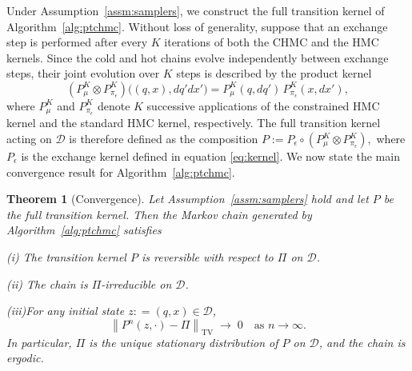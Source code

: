 \documentclass[12pt]{article}
\newtheorem{theorem}{Theorem}[section]
\begin{document}
Under Assumption~\ref{assm:samplers}, we construct the full transition kernel of Algorithm~\ref{alg:ptchmc}. Without loss of generality, suppose that an exchange step is performed after every $K$ iterations of both the CHMC and the HMC kernels. 
Since the cold and hot chains evolve independently between exchange steps, their joint evolution over $K$ steps is described by the product kernel
\[
\left(
P_\mu^K \otimes P_{\pi_\epsilon}^K
\right)
\big((q,x), dq' dx'\big)
=
P_\mu^K(q,dq') \,
P_{\pi_\epsilon}^K(x,dx'),
\]
where $P_\mu^K$ and $P_{\pi_\epsilon}^K$ denote $K$ successive applications of the constrained HMC kernel and the standard HMC kernel, respectively.
The full transition kernel acting on $\mathcal D$ is therefore defined as the composition
\(
P
:=
P_\epsilon
\circ
\left(
P_\mu^K \otimes P_{\pi_\epsilon}^K
\right),
\) where $P_\epsilon$ is the exchange kernel defined in equation \eqref{eq:kernel}.
We now state the main convergence result for Algorithm~\ref{alg:ptchmc}.

\begin{theorem}[Convergence]\label{thm:pt_full}
Let Assumption~\ref{assm:samplers} hold and let $P$ be the full transition kernel. Then the Markov chain generated by Algorithm~\ref{alg:ptchmc} satisfies

(i) The transition kernel $P$ is reversible with respect to $\Pi$ on $\mathcal{D}$.

(ii) The chain is $\Pi$-irreducible on $\mathcal{D}$.

(iii)For any initial state $z: = (q, x)\in\mathcal{D}$,
    \[
        \left\| P^n\left (z,\cdot \right ) - \Pi \right\|_{\mathrm{TV}} \;\longrightarrow\; 0 \quad \text{as } n\to\infty.
    \]
In particular, $\Pi$ is the unique stationary distribution of $P$ on $\mathcal{D}$, and the chain is ergodic.
\end{theorem}
\end{document}
